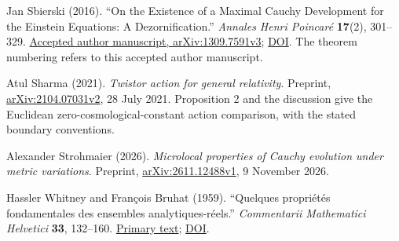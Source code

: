 \documentclass[
  english,
  11pt,
  reqno]{amsart}
\begin{document}
\begin{thebibliography}{}
\leavevmode{}\label{ref-Sbierski2016}%
Jan Sbierski (2016). ``On the Existence of a Maximal Cauchy Development
for the Einstein Equations: A Dezornification.'' \emph{Annales Henri
Poincaré} \textbf{17}(2), 301--329.
\href{https://arxiv.org/abs/1309.7591v3}{Accepted author manuscript,
arXiv:1309.7591v3};
\href{https://doi.org/10.1007/s00023-015-0401-5}{DOI}. The theorem
numbering refers to this accepted author manuscript.

\leavevmode{}\label{ref-Sharma2021}%
Atul Sharma (2021). \emph{Twistor action for general relativity}.
Preprint, \href{https://arxiv.org/abs/2104.07031v2}{arXiv:2104.07031v2},
28 July 2021. Proposition 2 and the discussion give the Euclidean
zero-cosmological-constant action comparison, with the stated boundary
conventions.

\leavevmode{}\label{ref-Strohmaier2026}%
Alexander Strohmaier (2026). \emph{Microlocal properties of Cauchy
evolution under metric variations}. Preprint,
\href{https://arxiv.org/abs/2611.12488v1}{arXiv:2611.12488v1}, 9
November 2026.

\leavevmode{}\label{ref-WhitneyBruhat1959}%
Hassler Whitney and François Bruhat (1959). ``Quelques propriétés
fondamentales des ensembles analytiques-réels.'' \emph{Commentarii
Mathematici Helvetici} \textbf{33}, 132--160.
\href{https://www.math.ens.psl.eu/~benoist/refs/WhitneyBruhat.pdf}{Primary
text}; \href{https://doi.org/10.1007/BF02565913}{DOI}.

\end{thebibliography}
\end{document}
